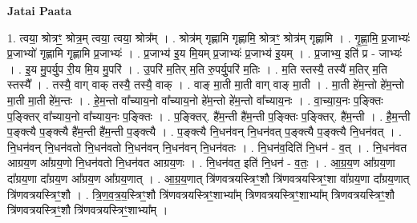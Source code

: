 \documentclass[17pt]{extarticle}
\begin{document}
\textbf{Jatai Paata} \newline

1. त्वया॒ श्रोत्रꣳ॒॒ श्रोत्र॒म् त्वया॒ त्वया॒ श्रोत्र᳚म् । . श्रोत्र॑म् गृह्णामि गृह्णामि॒ श्रोत्रꣳ॒॒ श्रोत्र॑म् गृह्णामि । . गृ॒ह्णा॒मि॒ प्र॒जाभ्यः॑ प्र॒जाभ्यो॑ गृह्णामि गृह्णामि प्र॒जाभ्यः॑ । . प्र॒जाभ्य॑ इ॒य मि॒यम् प्र॒जाभ्यः॑ प्र॒जाभ्य॑ इ॒यम् । . प्र॒जाभ्य॒ इति॑ प्र - जाभ्यः॑ । . इ॒य मु॒पर्यु॒प री॒य मि॒य मु॒परि॑ । . उ॒परि॑ म॒तिर् म॒ति रु॒पर्यु॒परि॑ म॒तिः । . म॒ति स्तस्यै॒ तस्यै॑ म॒तिर् म॒ति स्तस्यै᳚ । . तस्यै॒ वाग् वाक् तस्यै॒ तस्यै॒ वाक् । . वाङ् मा॒ती मा॒ती वाग् वाङ् मा॒ती । . मा॒ती हे॑म॒न्तो हे॑म॒न्तो मा॒ती मा॒ती हे॑म॒न्तः । . हे॒म॒न्तो वा᳚च्याय॒नो वा᳚च्याय॒नो हे॑म॒न्तो हे॑म॒न्तो वा᳚च्याय॒नः । . वा॒च्या॒य॒नः प॒ङ्क्तिः प॒ङ्क्तिर् वा᳚च्याय॒नो वा᳚च्याय॒नः प॒ङ्क्तिः । . प॒ङ्क्तिर्. है॑म॒न्ती है॑म॒न्ती प॒ङ्क्तिः प॒ङ्क्तिर्. है॑म॒न्ती । . है॒म॒न्ती प॒ङ्क्त्यै प॒ङ्क्त्यै है॑म॒न्ती है॑म॒न्ती प॒ङ्क्त्यै । . प॒ङ्क्त्यै नि॒धन॑वन् नि॒धन॑वत् प॒ङ्क्त्यै प॒ङ्क्त्यै नि॒धन॑वत् । . नि॒धन॑वन् नि॒धन॑वतो नि॒धन॑वतो नि॒धन॑वन् नि॒धन॑वन् नि॒धन॑वतः । . नि॒धन॑व॒दिति॑ नि॒धन॑ - व॒त् । . नि॒धन॑वत आग्रय॒ण आ᳚ग्रय॒णो नि॒धन॑वतो नि॒धन॑वत आग्रय॒णः । . नि॒धन॑वत॒ इति॑ नि॒धन॑ - व॒तः॒ । . आ॒ग्र॒य॒ण आ᳚ग्रय॒णा दा᳚ग्रय॒णा दा᳚ग्रय॒ण आ᳚ग्रय॒ण आ᳚ग्रय॒णात् । . आ॒ग्र॒य॒णात् त्रि॑णवत्रयस्त्रिꣳ॒॒शौ त्रि॑णवत्रयस्त्रिꣳ॒॒शा वा᳚ग्रय॒णा दा᳚ग्रय॒णात् त्रि॑णवत्रयस्त्रिꣳ॒॒शौ । . त्रि॒ण॒व॒त्र॒य॒स्त्रिꣳ॒॒शौ त्रि॑णवत्रयस्त्रिꣳ॒॒शाभ्या᳚म् त्रिणवत्रयस्त्रिꣳ॒॒शाभ्या᳚म् त्रिणवत्रयस्त्रिꣳ॒॒शौ त्रि॑णवत्रयस्त्रिꣳ॒॒शौ त्रि॑णवत्रयस्त्रिꣳ॒॒शाभ्या᳚म् । \newline
\end{document}
